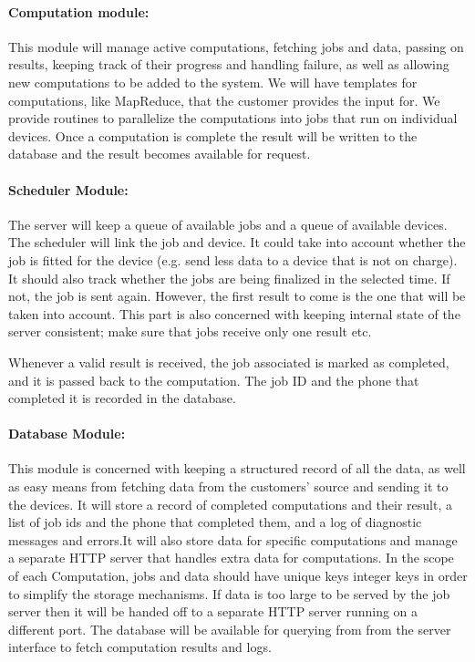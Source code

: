 \documentclass[a4paper,10pt]{article}
\begin{document}
\paragraph{Computation module:}

This module will manage active computations, fetching jobs and data, passing on results, keeping track of their progress and handling failure, as well as allowing new computations to be added to the system.
We will have templates for computations, like MapReduce, that the customer provides the input for. We provide routines to parallelize the computations into jobs that run on individual devices.
Once a computation is complete the result will be written to the database and the result becomes available for request.

\paragraph{Scheduler Module:}

The server will keep a queue of available jobs and a queue of available devices. The scheduler will link the job and device. It could take into account whether the job is fitted for the device (e.g. send less data to a device that is not on charge). It should also track whether the jobs are being finalized in the selected time. If not, the job is sent again. However, the first result to come is the one that will be taken into account. This part is also concerned with keeping internal state of the server consistent; make sure that jobs receive only one result etc.

Whenever a valid result is received, the job associated is marked as completed, and it is passed back to the computation. The job ID and the phone that completed it is recorded in the database.

\paragraph{Database Module:}

This module is concerned with keeping a structured record of all the data, as well as easy means from fetching data from the customers' source and sending it to the devices.
It will store a record of completed computations and their result, a list of job ids and the phone that completed them, and a log of diagnostic messages and errors.It will also store data for specific computations and manage a separate HTTP server that handles extra data for computations. In the scope of each Computation, jobs and data should have unique keys integer keys in order to simplify the storage mechanisms.
If data is too large to be served by the job server then it will be handed off to a separate HTTP server running on a different port.
The database will be available for querying from from the server interface to fetch computation results and logs.
\end{document}
